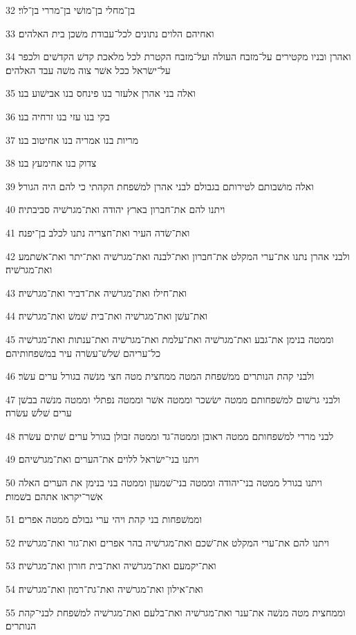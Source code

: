 \par 32 בן־מחלי בן־מושׁי בן־מררי בן־לוי׃
\par 33 ואחיהם הלוים נתונים לכל־עבודת משׁכן בית האלהים׃
\par 34 ואהרן ובניו מקטירים על־מזבח העולה ועל־מזבח הקטרת לכל מלאכת קדשׁ הקדשׁים ולכפר על־ישׂראל ככל אשׁר צוה משׁה עבד האלהים׃
\par 35 ואלה בני אהרן אלעזר בנו פינחס בנו אבישׁוע בנו׃
\par 36 בקי בנו עזי בנו זרחיה בנו׃
\par 37 מריות בנו אמריה בנו אחיטוב בנו׃
\par 38 צדוק בנו אחימעץ בנו׃
\par 39 ואלה מושׁבותם לטירותם בגבולם לבני אהרן למשׁפחת הקהתי כי להם היה הגורל׃
\par 40 ויתנו להם את־חברון בארץ יהודה ואת־מגרשׁיה סביבתיה׃
\par 41 ואת־שׂדה העיר ואת־חצריה נתנו לכלב בן־יפנה׃
\par 42 ולבני אהרן נתנו את־ערי המקלט את־חברון ואת־לבנה ואת־מגרשׁיה ואת־יתר ואת־אשׁתמע ואת־מגרשׁיה׃
\par 43 ואת־חילז ואת־מגרשׁיה את־דביר ואת־מגרשׁיה׃
\par 44 ואת־עשׁן ואת־מגרשׁיה ואת־בית שׁמשׁ ואת־מגרשׁיה׃
\par 45 וממטה בנימן את־גבע ואת־מגרשׁיה ואת־עלמת ואת־מגרשׁיה ואת־ענתות ואת־מגרשׁיה כל־עריהם שׁלשׁ־עשׂרה עיר במשׁפחותיהם׃
\par 46 ולבני קהת הנותרים ממשׁפחת המטה ממחצית מטה חצי מנשׁה בגורל ערים עשׂר׃
\par 47 ולבני גרשׁום למשׁפחותם ממטה ישׂשכר וממטה אשׁר וממטה נפתלי וממטה מנשׁה בבשׁן ערים שׁלשׁ עשׂרה׃
\par 48 לבני מררי למשׁפחותם ממטה ראובן וממטה־גד וממטה זבולן בגורל ערים שׁתים עשׂרה׃
\par 49 ויתנו בני־ישׂראל ללוים את־הערים ואת־מגרשׁיהם׃
\par 50 ויתנו בגורל ממטה בני־יהודה וממטה בני־שׁמעון וממטה בני בנימן את הערים האלה אשׁר־יקראו אתהם בשׁמות׃
\par 51 וממשׁפחות בני קהת ויהי ערי גבולם ממטה אפרים׃
\par 52 ויתנו להם את־ערי המקלט את־שׁכם ואת־מגרשׁיה בהר אפרים ואת־גזר ואת־מגרשׁיה׃
\par 53 ואת־יקמעם ואת־מגרשׁיה ואת־בית חורון ואת־מגרשׁיה׃
\par 54 ואת־אילון ואת־מגרשׁיה ואת־גת־רמון ואת־מגרשׁיה׃
\par 55 וממחצית מטה מנשׁה את־ענר ואת־מגרשׁיה ואת־בלעם ואת־מגרשׁיה למשׁפחת לבני־קהת הנותרים׃
